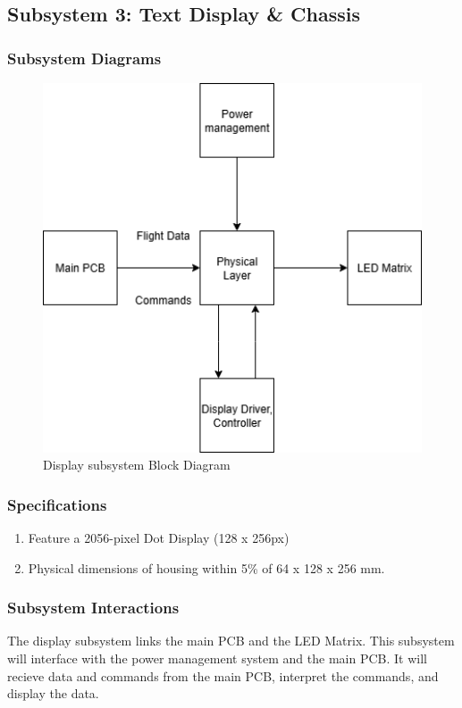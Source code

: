 \subsection{Subsystem 3: Text Display \& Chassis}
\subsubsection{Subsystem Diagrams}
\begin{figure}[h]
    \centering
    \includegraphics[width=12cm]{images/DisplayDriver/blockDiagram-display.png} %
    \caption{Display subsystem Block Diagram}
\end{figure} %

\subsubsection{Specifications}
\begin{enumerate}
    \item Feature a 2056-pixel Dot Display (128 x 256px)
    \item Physical dimensions of housing within 5\% of 64 x 128 x 256 mm.
\end{enumerate}

\subsubsection{Subsystem Interactions}
The display subsystem links the main PCB and the LED Matrix. This subsystem will interface with the power management system and the main PCB. It will recieve data and commands from the main PCB, interpret the commands, and display the data.

